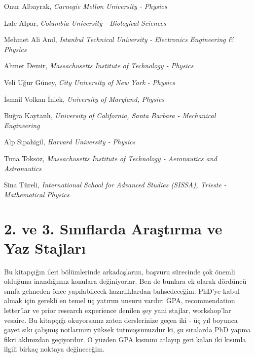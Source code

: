 \documentclass[12pt]{article}
\theoremstyle{break}
\begin{document}
Onur Albayrak, \textit{Carnegie Mellon University - Physics }

Lale Alpar, \textit{Columbia University - Biological Sciences}

Mehmet Ali Anıl, \textit{Istanbul Technical University - Electronics Engineering \& Physics}

Ahmet Demir, \textit{Massachusetts Institute of Technology - Physics}

Veli Uğur Güney, \textit{City University of New York - Physics }

İsmail Volkan İnlek, \textit{University of Maryland, Physics}

Buğra Kaytanlı, \textit{University of California, Santa Barbara - Mechanical Engineering}

Alp Sipahigil, \textit{Harvard University - Physics }

Tuna Toksöz, \textit{Massachusetts Institute of Technology - Aeronautics and Astronautics }

Sina Türeli, \textit{International School for Advanced Studies (SISSA), Trieste - Mathematical Physics}

\newpage
%
%
\section{2. ve 3. Sınıflarda Araştırma ve Yaz Stajları}
Bu kitapçığın ileri bölümlerinde arkadaşlarım, başvuru sürecinde çok önemli olduğuna inandığımız konulara değiniyorlar. Ben de bunlara ek olarak dördüncü sınıfa gelmeden önce yapılabilecek hazırlıklardan bahsedeceğim. PhD’ye kabul almak için gerekli en temel üç yatırım unsuru vardır: GPA, recommendation letter’lar ve prior research experience denilen şey yani stajlar, workshop’lar vesaire. Bu kitapçığı okuyorsanız zaten derslerinize geçen iki - üç yıl boyunca gayet sıkı çalışmış notlarınızı yüksek tutmuşsunuzdur ki, şu sıralarda PhD yapma fikri aklınızdan geçiyordur. O yüzden GPA kısmını atlayıp geri kalan iki kısımla ilgili birkaç noktaya değineceğim.
\end{document}
